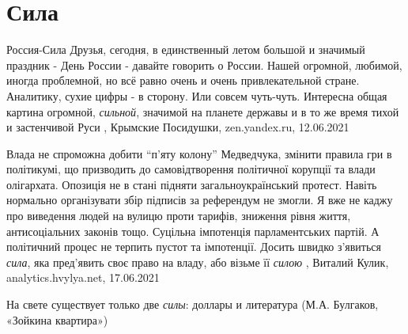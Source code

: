  
 
 
 
 
\chapter{Сила}
\label{sec:slova.sila}

Россия-Сила
Друзья, сегодня, в единственный летом большой и значимый праздник - День России
- давайте говорить о России. Нашей огромной, любимой, иногда проблемной, но всё
равно очень и очень привлекательной стране.  Аналитику, сухие цифры - в
сторону. Или совсем чуть-чуть. Интересна общая картина огромной,
\emph{сильной}, значимой на планете державы и в то же время тихой и застенчивой
Руси
, 
Крымские Посидушки, zen.yandex.ru, 12.06.2021

Влада не спроможна добити \enquote{п'яту колону} Медведчука, змінити правила гри в
політикумі, що призводить до самовідтворення політичної корупції та влади
олігархата. Опозиція не в стані підняти загальноукраїнський протест. Навіть
нормально організувати збір підписів за референдум не змогли. Я вже не каджу
про виведення людей на вулицю проти тарифів, зниження рівня життя,
антисоціальних законів тощо. Суцільна імпотенція парламентських партій.  А
політичний процес не терпить пустот та імпотенції. Досить швидко з'явиться
\emph{сила}, яка пред'явить своє право на владу, або візьме її \emph{силою}
, 
Виталий Кулик, analytics.hvylya.net, 17.06.2021

На свете существует только две \emph{силы}: доллары и литература (М.А. Булгаков, «Зойкина квартира»)

